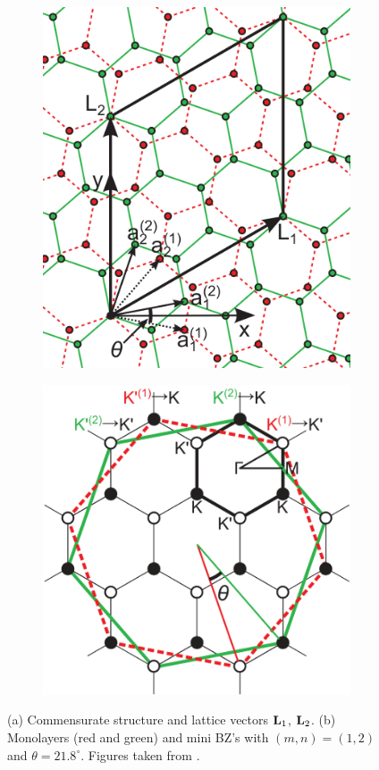 \documentclass[12pt]{report}
\begin{document}
\begin{figure}[H]
\centering
\begin{subfigure}{.5\textwidth}
  \centering
  \includegraphics[height=.6\linewidth]{fig/latvec.png}
  \caption{}
  \label{fig:latvec}
\end{subfigure}%
\begin{subfigure}{.5\textwidth}
  \centering
  \includegraphics[height=.6\linewidth]{fig/bzminibz.png}
  \caption{}
  \label{fig:bzminibz}
\end{subfigure}
\caption{(a) Commensurate structure and lattice vectors $\vb{L}_1$, $\vb{L}_2$. (b) Monolayers (red and green) and mini BZ's with $(m,n) = (1,2)$ and $\theta = 21.8^\circ$. Figures taken from \cite{koshino2012}.}
\label{fig:geometry}
\end{figure}

\end{document}
